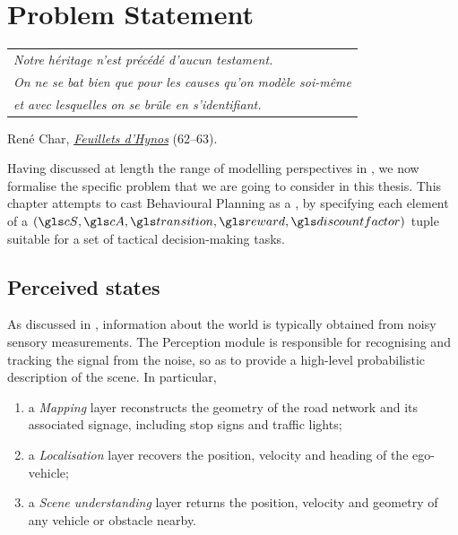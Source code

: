 
\graphicspath{{2-Chapters/3-Chapter/}}

\chapter{Problem Statement}
\label{chapter:3}

\begin{flushright}
	\begin{tabular}{@{}l@{}}
		\emph{Notre héritage n'est précédé d'aucun testament.}\\
		\emph{On ne se bat bien que pour les causes qu'on modèle soi-même}\\
		\emph{et avec lesquelles on se brûle en s'identifiant.}\\
	\end{tabular}
	
	René Char, \href{https://eleurent.github.io/sisyphe/texts/feuillets-d-hypnos.html}{\emph{Feuillets d'Hynos}} {\small (62--63)}.
\end{flushright}


\abstractStartChapter{}%
Having discussed at length the range of  modelling perspectives in , we now formalise the specific problem that we are going to consider in this thesis. This chapter attempts to cast Behavioural Planning as a , by specifying each element of a $(\cS, \cA, \Ps, \R, \discount)$ tuple suitable for a set of tactical decision-making tasks.
\minitocStartChapter{}

\section{Perceived states}

As discussed in , information about the world is typically obtained from noisy sensory measurements. The Perception module is responsible for recognising and tracking the signal from the noise, so as to provide a high-level probabilistic description of the scene. In particular, 
\begin{enumerate}[label=(\roman*)]
	\item a \emph{Mapping} layer reconstructs the geometry of the road network and its associated signage, including stop signs and traffic lights;
	\item a \emph{Localisation} layer recovers the position, velocity and heading of the ego-vehicle;
	\item a \emph{Scene understanding} layer returns the position, velocity and geometry of any vehicle or obstacle nearby.
\end{enumerate}

